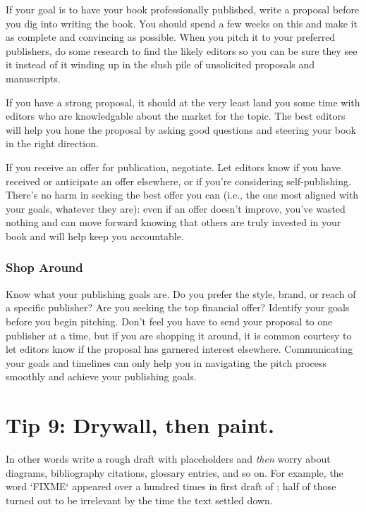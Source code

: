 \documentclass[10pt,letterpaper]{article}
\begin{document}
If your goal is to have your book professionally published,
write a proposal before you dig into writing the book.
You should spend a few weeks on this
and make it as complete and convincing as possible.
When you pitch it to your preferred publishers,
do some research to find the likely editors
so you can be sure they see it
instead of it winding up in the slush pile of unsolicited proposals and manuscripts.

If you have a strong proposal,
it should at the very least land you some time with editors
who are knowledgable about the market for the topic.
The best editors will help you hone the proposal
by asking good questions and steering your book in the right direction.

If you receive an offer for publication, negotiate.
Let editors know if you have received or anticipate an offer elsewhere, 
or if you're considering self-publishing.
There's no harm in seeking the best offer you can (i.e., the one
most aligned with your goals, whatever they are):
even if an offer doesn't improve, you've wasted nothing
and can move forward knowing that others are truly invested in your book
and will help keep you accountable.

\subsubsection*{Shop Around}

Know what your publishing goals are.
Do you prefer the style, brand, or reach of a specific publisher?
Are you seeking the top financial offer?
Identify your goals before you begin pitching.
Don't feel you have to send your proposal to one publisher at a time,
but if you are shopping it around,
it is common courtesy to let editors know if the proposal has garnered interest elsewhere.
Communicating your goals and timelines can only help you
in navigating the pitch process smoothly and achieve your publishing goals. 

\section*{Tip 9: Drywall, then paint.}

In other words write a rough draft with placeholders
and \emph{then} worry about diagrams, bibliography citations, glossary entries, and so on.
For example,
the word `FIXME` appeared over a hundred times in first draft of \cite{Wi2019};
half of those turned out to be irrelevant by the time the text settled down.
\end{document}
